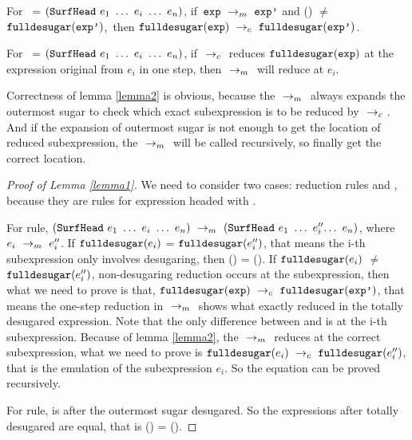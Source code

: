 \begin{lemma}[Emulation]
\label{lemma1}
For~ = $(\mbox{\tt SurfHead}~e_1~\ldots~e_i~\ldots~e_n)$, if~$\mbox{\tt exp} ~\rightarrow_m~\mbox{\tt exp'}$ and () $\not=$ $\mbox{\tt fulldesugar}(\mbox{\tt exp'})$,~then $\mbox{\tt fulldesugar}(\mbox{\tt exp}) ~\rightarrow_c~\mbox{\tt fulldesugar}(\mbox{\tt exp'})$.

\end{lemma}

\begin{lemma}
\label{lemma2}

For~ = $(\mbox{\tt SurfHead}~e_1~\ldots~e_i~\ldots~e_n)$, if $~\rightarrow_c~$ reduces $\mbox{\tt fulldesugar}(\mbox{\tt exp})$ at the expression original from $e_i$ in one step, then $~\rightarrow_m~$ will reduce  at $e_i$.

\end{lemma}

Correctness of lemma \ref{lemma2} is obvious, because the $~\rightarrow_m~$ always expands the outermost sugar to check which exact subexpression is to be reduced by $~\rightarrow_c~$. And if the expansion of outermost sugar is not enough to get the location of reduced subexpression, the $~\rightarrow_m~$ will be called recursively, so finally get the correct location.
\begin{proof}[Proof of Lemma \ref{lemma1}]
We need to consider two cases: reduction rules  and , because they are rules for expression headed with .

For  rule, $\redm{(\m{SurfHead}~e_1~\ldots~e_i~\ldots~e_n)}{(\m{SurfHead}~e_1~\ldots~e_i''$$\ldots~e_n)}$, where $e_i ~\rightarrow_m~e_i''$. 
If $\mbox{\tt fulldesugar}(e_i)$ = $\mbox{\tt fulldesugar}(e_i'')$, that means the i-th subexpression only involves desugaring, then () = (). If $\mbox{\tt fulldesugar}(e_i)$ $\not=$ $\mbox{\tt fulldesugar}(e_i'')$, non-desugaring reduction occurs at the subexpression, then what we need to prove is that, $\mbox{\tt fulldesugar}(\mbox{\tt exp}) ~\rightarrow_c~\mbox{\tt fulldesugar}(\mbox{\tt exp'})$, that means the one-step reduction in $~\rightarrow_m~$ shows what exactly reduced in the totally desugared expression. Note that the only difference between  and  is at the i-th subexpression. Because of lemma \ref{lemma2}, the $~\rightarrow_m~$ reduces  at the correct subexpression, what we need to prove is $\mbox{\tt fulldesugar}(e_i) ~\rightarrow_c~\mbox{\tt fulldesugar}(e_i'')$, that is the emulation of the subexpression $e_i$. So the equation can be proved recursively.

For  rule,  is  after the outermost sugar desugared. So the expressions after totally desugared are equal, that is () =
().
\end{proof}

